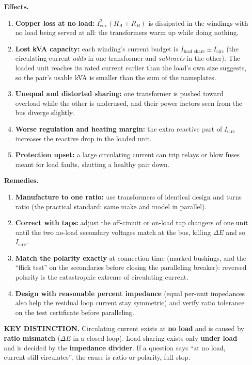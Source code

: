 \documentclass[11pt]{article}
\newcommand{\keydist}[1]{\vspace{2pt}\textbf{\color{red}KEY DISTINCTION.} #1}
\begin{document}
\textbf{Effects.}
\begin{enumerate}[label=\arabic*.]
\item \textbf{Copper loss at no load:} $I_{\text{circ}}^{2}\left(R_A + R_B\right)$ is dissipated in the windings with no load being served at all: the transformers warm up while doing nothing.
\item \textbf{Lost kVA capacity:} each winding's current budget is $I_{\text{load share}} \pm I_{\text{circ}}$ (the circulating current \emph{adds} in one transformer and \emph{subtracts} in the other). The loaded unit reaches its rated current earlier than the load's own size suggests, so the pair's usable kVA is smaller than the sum of the nameplates.
\item \textbf{Unequal and distorted sharing:} one transformer is pushed toward overload while the other is underused, and their power factors seen from the bus diverge slightly.
\item \textbf{Worse regulation and heating margin:} the extra reactive part of $I_{\text{circ}}$ increases the reactive drop in the loaded unit.
\item \textbf{Protection upset:} a large circulating current can trip relays or blow fuses meant for load faults, shutting a healthy pair down.
\end{enumerate}

\textbf{Remedies.}
\begin{enumerate}[label=\arabic*.]
\item \textbf{Manufacture to one ratio:} use transformers of identical design and turns ratio (the practical standard: same make and model in parallel).
\item \textbf{Correct with taps:} adjust the off-circuit or on-load tap changers of one unit until the two no-load secondary voltages match at the bus, killing $\Delta E$ and so $I_{\text{circ}}$.
\item \textbf{Match the polarity exactly} at connection time (marked bushings, and the ``flick test'' on the secondaries before closing the paralleling breaker): reversed polarity is the catastrophic extreme of circulating current.
\item \textbf{Design with reasonable percent impedance} (equal per-unit impedances also help the residual loop current stay symmetric) and verify ratio tolerance on the test certificate before paralleling.
\end{enumerate}

\keydist{Circulating current exists at \textbf{no load} and is caused by \textbf{ratio mismatch} ($\Delta E$ in a closed loop). Load sharing exists only \textbf{under load} and is decided by the \textbf{impedance divider}. If a question says ``at no load, current still circulates'', the cause is ratio or polarity, full stop.}
\end{document}
